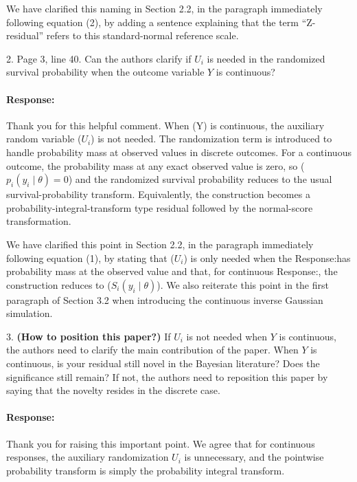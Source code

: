 \documentclass[11pt]{article}
\newcommand*{\mybox}[2]{\colorbox{#1!30}{\parbox{.98\linewidth}{#2}}}
\begin{document}
 We have clarified this naming in Section 2.2, in the paragraph immediately following equation (2), by adding a sentence explaining that the term “Z-residual” refers to this standard-normal reference scale.


\medskip

\mybox{gray}{2. Page 3, line 40. Can the authors clarify if $U_i$ is needed in the randomized survival probability when the outcome variable $Y$ is continuous?}

\paragraph{Response:}
Thank you for this helpful comment. When (Y) is continuous, the auxiliary random variable ($U_i$) is not needed. The randomization term is introduced to handle probability mass at observed values in discrete outcomes. For a continuous outcome, the probability mass at any exact observed value is zero, so ($p_i(y_i\mid\theta)=0$) and the randomized survival probability reduces to the usual survival-probability transform. Equivalently, the construction becomes a probability-integral-transform type residual followed by the normal-score transformation. 

 We have clarified this point in Section 2.2, in the paragraph immediately following equation (1), by stating that ($U_i$) is only needed when the Response:has probability mass at the observed value and that, for continuous Response:, the construction reduces to ($S_i(y_i\mid\theta)$). We also reiterate this point in the first paragraph of Section 3.2 when introducing the continuous inverse Gaussian simulation.

\medskip

\mybox{gray}{3. \textbf{(How to position this paper?)} If $U_i$ is not needed when $Y$ is continuous, the authors need to clarify the main contribution of the paper. When $Y$ is continuous, is your residual still novel in the Bayesian literature? Does the significance still remain? If not, the authors need to reposition this paper by saying that the novelty resides in the discrete case.}

\paragraph{Response:}

Thank you for raising this important point. We agree that for continuous responses, the auxiliary randomization $U_i$ is unnecessary, and the pointwise probability transform is simply the probability integral transform. 
\end{document}
